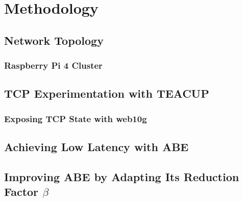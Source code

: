 \chapter{Methodology}


\section{Network Topology}

\subsection{Raspberry Pi 4 Cluster}



\section{TCP Experimentation with TEACUP}

\subsection{Exposing TCP State with web10g}


\section{Achieving Low Latency with ABE}



\section{Improving ABE by Adapting Its Reduction Factor \texorpdfstring{$\beta$}{} }